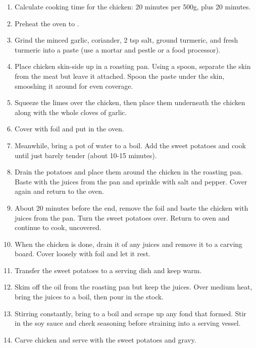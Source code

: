 \begin{enumerate}
    \item Calculate cooking time for the chicken: 20 minutes per 500g, plus 20 minutes.
    \item Preheat the oven to .
    \item Grind the minced garlic, coriander, 2 tsp salt, ground turmeric, and fresh turmeric into a paste (use a mortar and pestle or a food processor).
    \item Place chicken skin-side up in a roasting pan. Using a spoon, separate the skin from the meat but leave it attached. Spoon the paste under the skin, smooshing it around for even coverage.
    \item Squeeze the limes over the chicken, then place them underneath the chicken along with the whole cloves of garlic.
    \item Cover with foil and put in the oven.
    \item Meanwhile, bring a pot of water to a boil. Add the sweet potatoes and cook until just barely tender (about 10-15 minutes).
    \item Drain the potatoes and place them around the chicken in the roasting pan. Baste with the juices from the pan and sprinkle with salt and pepper. Cover again and return to the oven.
    \item About 20 minutes before the end, remove the foil and baste the chicken with juices from the pan. Turn the sweet potatoes over. Return to oven and continue to cook, uncovered.
    \item When the chicken is done, drain it of any juices and remove it to a carving board. Cover loosely with foil and let it rest.
    \item Transfer the sweet potatoes to a serving dish and keep warm.
    \item Skim off the oil from the roasting pan but keep the juices. Over medium heat, bring the juices to a boil, then pour in the stock.
    \item Stirring constantly, bring to a boil and scrape up any fond that formed. Stir in the soy sauce and check seasoning before straining into a serving vessel.
    \item Carve chicken and serve with the sweet potatoes and gravy.
\end{enumerate}
